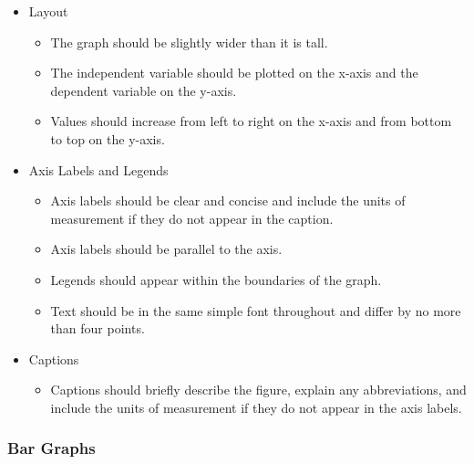 \documentclass[
]{krantz}
\providecommand{\tightlist}{%
  \setlength{\itemsep}{0pt}\setlength{\parskip}{0pt}}
\begin{document}
\begin{itemize}
\tightlist
\item
  Layout

  \begin{itemize}
  \tightlist
  \item
    The graph should be slightly wider than it is tall.
  \item
    The independent variable should be plotted on the x-axis and the dependent variable on the y-axis.
  \item
    Values should increase from left to right on the x-axis and from bottom to top on the y-axis.
  \end{itemize}
\item
  Axis Labels and Legends

  \begin{itemize}
  \tightlist
  \item
    Axis labels should be clear and concise and include the units of measurement if they do not appear in the caption.
  \item
    Axis labels should be parallel to the axis.
  \item
    Legends should appear within the boundaries of the graph.
  \item
    Text should be in the same simple font throughout and differ by no more than four points.
  \end{itemize}
\item
  Captions

  \begin{itemize}
  \tightlist
  \item
    Captions should briefly describe the figure, explain any abbreviations, and include the units of measurement if they do not appear in the axis labels.
  \end{itemize}
\end{itemize}

\subsubsection*{Bar Graphs}\label{bar-graphs}
\end{document}

